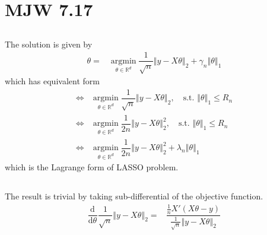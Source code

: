 \documentclass[11pt,a4paper]{ctexart}
\numberwithin{equation}{section}%
\begin{document}
\section{MJW 7.17}

\subsection{}
The solution is given by
\begin{align*}
    \theta =& \mathop{ \arg\min  }\limits_{\theta \in \mathbb{R}^d} \dfrac{ 1 }{ \sqrt{n } } \left\Vert y-X\theta  \right\Vert _2 + \gamma _n\left\Vert \theta   \right\Vert _1 
\end{align*}
which has equivalent form
\begin{align*}
    \Leftrightarrow & \mathop{ \arg\min  }\limits_{\theta \in \mathbb{R}^d} \dfrac{ 1 }{ \sqrt{n} } \left\Vert y-X\theta  \right\Vert _2, \quad \text{s.t. } \left\Vert \theta  \right\Vert _1\leq R_n \\
    \Leftrightarrow & \mathop{ \arg\min  }\limits_{\theta \in \mathbb{R}^d} \dfrac{ 1 }{ 2n } \left\Vert y-X\theta  \right\Vert _2^2, \quad \text{s.t. } \left\Vert \theta  \right\Vert _1\leq R_n\\
    \Leftrightarrow & \mathop{ \arg\min  }\limits_{\theta \in \mathbb{R}^d} \dfrac{ 1 }{ 2n } \left\Vert y-X\theta  \right\Vert _2^2+ \lambda _n\left\Vert \theta  \right\Vert _1
\end{align*}
which is the Lagrange form of LASSO problem.

\subsection{}
The result is trivial by taking sub-differential of the objective function.
\begin{align*}
    \dfrac{\mathrm{d}^{}  }{\mathrm{d} \theta ^{} } \dfrac{ 1 }{ \sqrt{n } } \left\Vert y-X\theta  \right\Vert _2 = & \dfrac{ \frac{1}{n} X'(X\theta -y) }{ \frac{1}{\sqrt{n}}\left\Vert y-X\theta  \right\Vert _2 } 
\end{align*}
\end{document}
